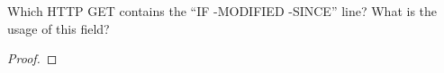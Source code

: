 \documentclass[../../main.tex]{subfiles}
\begin{document}
\begin{wts}
Which HTTP GET contains the “IF -MODIFIED -SINCE” line? What is the usage of this field?
\end{wts}
\begin{proof}

\end{proof}
\end{document}

